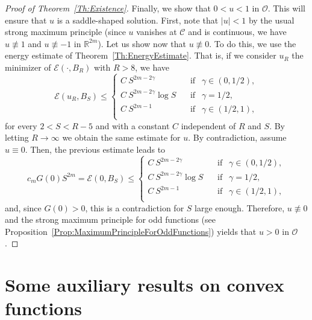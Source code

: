 \documentclass[12pt,reqno]{amsart}
\theoremstyle{definition}
\theoremstyle{remark}
\newcommand{\con}[1]{\mathbb{#1}}
\newcommand{\R}{\con{R}} %
\newcommand{\ccal}{\mathscr{C}}
\newcommand{\ecal}{\mathcal{E}}
\newcommand{\ocal}{\mathcal{O}}
\newcommand{\s}{\gamma}
\numberwithin{equation}{section}
\begin{document}
\begin{proof}[Proof of Theorem~\ref{Th:Existence}]
	Finally, we show that $0<u<1$ in $\ocal$. This will ensure that $u$ is a saddle-shaped solution. First, note that $|u| < 1$ by the usual strong maximum principle (since $u$ vanishes at $\ccal$ and is continuous, we have $u \not \equiv 1$  and $u\not\equiv -1$ in $\R^{2m}$). Let us show now that $u\not\equiv 0$. To do this, we use the energy estimate of Theorem~\ref{Th:EnergyEstimate}. That is, if we consider $u_R$ the minimizer of $\ecal(\cdot, B_R)$ with $R > 8$, we have
	$$
	\ecal (u_R,B_S) \leq \begin{cases}
	C \ S^{2m-2\s}\ \ \ \ &\textrm{if } \ \ \s\in(0,1/2),\\
	C\ S^{2m-2\s} \log S \ \ \ \ &\textrm{if } \ \ \s=1/2,\\
	C \ S^{2m-1}\ \ \ \ &\textrm{if } \ \ \s\in(1/2,1),\\
	\end{cases} $$
	for every $2 < S < R-5$ and with a constant $C$ independent of $R$ and $S$. By letting $R \to \infty$ we obtain the same estimate for $u$. By contradiction, assume $u\equiv 0$. Then, the previous estimate leads to
	$$
	c_m G(0)S^{2m} = \ecal(0, B_S) \leq \begin{cases}
	C \ S^{2m-2\s}\ \ \ \ &\textrm{if } \ \ \s\in(0,1/2),\\
	C\ S^{2m-2\s} \log S\ \ \ \ &\textrm{if } \ \ \s=1/2,\\
	C \ S^{2m-1}\ \ \ \ &\textrm{if } \ \ \s\in(1/2,1),\\
	\end{cases} $$
	and, since $G(0)>0$, this is a contradiction for $S$ large enough. Therefore, $u \not \equiv 0$ and the strong maximum principle for odd functions (see Proposition~\ref{Prop:MaximumPrincipleForOddFunctions}) yields that $u>0$ in $\ocal$. 
\end{proof}




\appendix


\section{Some auxiliary results on convex functions}
\label{Sec:AuxiliaryResults}
\end{document}
